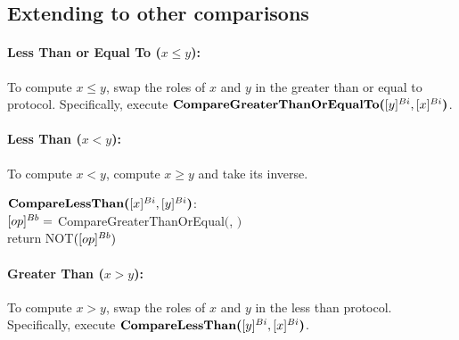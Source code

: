 \subsection{Extending to other comparisons}

\paragraph{\bf Less Than or Equal To ($x \leq y$):} To compute $x \leq y$, swap the roles of $x$ and $y$ in the greater than or equal to protocol. Specifically, execute $\textbf{CompareGreaterThanOrEqualTo(}[y]^{Bi}, [x]^{Bi}\textbf{)}$.

\paragraph{\bf Less Than ($x < y$):}  To compute $x < y$, compute $x \geq y$ and take its inverse.

\begin{protocol}	
	$\textbf{CompareLessThan(}[x]^{Bi}, [y]^{Bi}\textbf{)}$:\\
	\indent $[op]^{Bb} =$ CompareGreaterThanOrEqual$($, $)$ \\
	\indent return NOT$([op]^{Bb})$
\end{protocol}

\paragraph{\bf Greater Than ($x > y$):} To compute $x > y$, swap the roles of $x$ and $y$ in the less than protocol. Specifically, execute $\textbf{CompareLessThan(}[y]^{Bi}, [x]^{Bi}\textbf{)}$.

